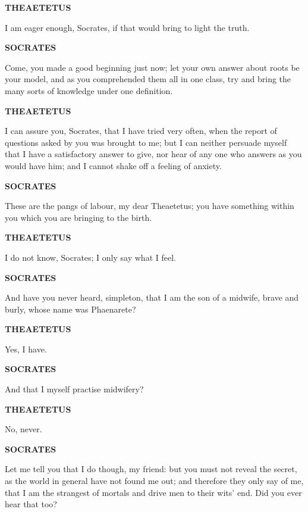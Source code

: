 \documentclass[11pt,letter]{article}
\begin{document}
\par \textbf{THEAETETUS}
\par   I am eager enough, Socrates, if that would bring to light the truth.

\par \textbf{SOCRATES}
\par   Come, you made a good beginning just now; let your own answer about roots be your model, and as you comprehended them all in one class, try and bring the many sorts of knowledge under one definition.

\par \textbf{THEAETETUS}
\par   I can assure you, Socrates, that I have tried very often, when the report of questions asked by you was brought to me; but I can neither persuade myself that I have a satisfactory answer to give, nor hear of any one who answers as you would have him; and I cannot shake off a feeling of anxiety.

\par \textbf{SOCRATES}
\par   These are the pangs of labour, my dear Theaetetus; you have something within you which you are bringing to the birth.

\par \textbf{THEAETETUS}
\par   I do not know, Socrates; I only say what I feel.

\par \textbf{SOCRATES}
\par   And have you never heard, simpleton, that I am the son of a midwife, brave and burly, whose name was Phaenarete?

\par \textbf{THEAETETUS}
\par   Yes, I have.

\par \textbf{SOCRATES}
\par   And that I myself practise midwifery?

\par \textbf{THEAETETUS}
\par   No, never.

\par \textbf{SOCRATES}
\par   Let me tell you that I do though, my friend:  but you must not reveal the secret, as the world in general have not found me out; and therefore they only say of me, that I am the strangest of mortals and drive men to their wits' end. Did you ever hear that too?
\end{document}
